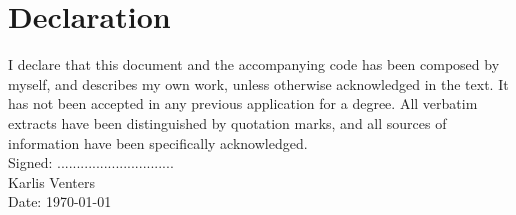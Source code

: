 \newpage
\section*{Declaration}

I declare that this document and the accompanying code has been
composed by myself, and describes my own work, unless otherwise acknowledged in
the text. It has not been accepted in any previous application for a degree.
All verbatim extracts have been distinguished by quotation marks, and all
sources of information have been specifically acknowledged.\\[5ex]

Signed: .............................. \\[3ex]

Karlis Venters \\[3ex]

Date: \today \\[3ex]
